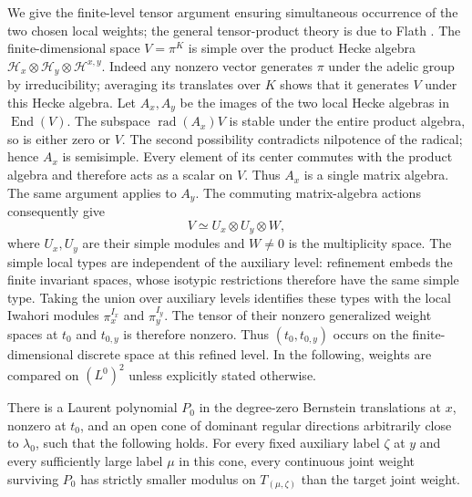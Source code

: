 We give the finite-level tensor argument ensuring simultaneous
occurrence of the two chosen local weights; the general tensor-product
theory is due to Flath \cite{FlathTensorProducts}.
The finite-dimensional space $V=\pi^K$ is simple over the product
Hecke algebra $\mathcal H_x\otimes\mathcal H_y\otimes\mathcal H^{x,y}$.
Indeed any nonzero vector generates $\pi$ under the adelic group by
irreducibility; averaging its translates over $K$ shows that it
generates $V$ under this Hecke algebra.
Let $A_x,A_y$ be the images of the two local Hecke algebras in
$\operatorname{End}(V)$. The subspace
$\operatorname{rad}(A_x)V$ is stable under the entire product algebra,
so is either zero or $V$. The second possibility contradicts
nilpotence of the radical; hence $A_x$ is semisimple.
Every element of its center commutes with the product algebra and
therefore acts as a scalar on $V$. Thus $A_x$ is a single matrix
algebra. The same argument applies to $A_y$.
The commuting matrix-algebra actions consequently give
\[
                  V\simeq U_x\otimes U_y\otimes W,
\]
where $U_x,U_y$ are their simple modules and $W\ne0$ is the
multiplicity space. The simple local types are independent of the
auxiliary level: refinement embeds the finite invariant spaces,
whose isotypic restrictions therefore have the same simple type.
Taking the union over auxiliary levels identifies these types with
the local Iwahori modules $\pi_x^{I_x}$ and $\pi_y^{I_y}$.
The tensor of their nonzero generalized weight spaces at $t_0$ and
$t_{0,y}$ is therefore nonzero. Thus $(t_0,t_{0,y})$ occurs on the
finite-dimensional discrete space at this refined level.
In the following, weights are compared on $(L^0)^2$ unless explicitly
stated otherwise.

\begin{lemma}\label{ext:spectral-gap}
 There is a Laurent polynomial $P_0$ in the degree-zero Bernstein
 translations at $x$, nonzero at $t_0$, and an open cone of dominant
 regular directions arbitrarily close to $\lambda_0$, such that the
 following holds.  For every fixed auxiliary label $\zeta$ at $y$
 and every sufficiently large label $\mu$ in this cone, every continuous
 joint weight surviving $P_0$ has strictly smaller modulus on
 $T_{(\mu,\zeta)}$ than the target joint weight.
\end{lemma}

